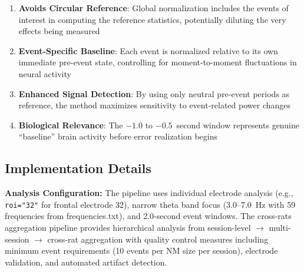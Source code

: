 \documentclass[11pt]{article}
\begin{document}
\begin{enumerate}
\item \textbf{Avoids Circular Reference}: Global normalization includes the events of interest in computing the reference statistics, potentially diluting the very effects being measured
\item \textbf{Event-Specific Baseline}: Each event is normalized relative to its own immediate pre-event state, controlling for moment-to-moment fluctuations in neural activity
\item \textbf{Enhanced Signal Detection}: By using only neutral pre-event periods as reference, the method maximizes sensitivity to event-related power changes
\item \textbf{Biological Relevance}: The $-1.0$ to $-0.5$~second window represents genuine ``baseline'' brain activity before error realization begins
\end{enumerate}

\subsection{Implementation Details}

\textbf{Analysis Configuration:} The pipeline uses individual electrode analysis (e.g., \texttt{roi="32"} for frontal electrode 32), narrow theta band focus (3.0--7.0~Hz with 59 frequencies from frequencies.txt), and 2.0-second event windows. The cross-rats aggregation pipeline provides hierarchical analysis from session-level $\rightarrow$ multi-session $\rightarrow$ cross-rat aggregation with quality control measures including minimum event requirements (10 events per NM size per session), electrode validation, and automated artifact detection.
\end{document}

